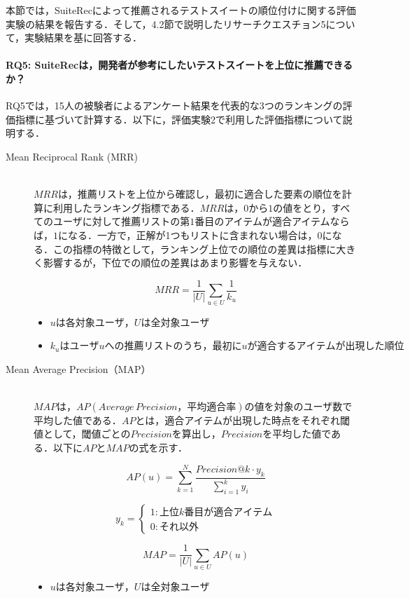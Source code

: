 \documentclass[12pt]{jarticle} %
\begin{document}
本節では，{\sf SuiteRec}によって推薦されるテストスイートの順位付けに関する評価実験の結果を報告する．そして，4.2節で説明したリサーチクエスチョン5について，実験結果を基に回答する．

\paragraph{RQ5: SuiteRecは，開発者が参考にしたいテストスイートを上位に推薦できるか？}
RQ5では，15人の被験者によるアンケート結果を代表的な3つのランキングの評価指標に基づいて計算する．以下に，評価実験2で利用した評価指標について説明する．


\begin{description}
\item[Mean Reciprocal Rank (MRR)]~\\
$MRR$は，推薦リストを上位から確認し，最初に適合した要素の順位を計算に利用したランキング指標である．$MRR$は，$0$から$1$の値をとり，すべてのユーザに対して推薦リストの第$1$番目のアイテムが適合アイテムならば，$1$になる．一方で，正解が1つもリストに含まれない場合は，$0$になる．この指標の特徴として，ランキング上位での順位の差異は指標に大きく影響するが，下位での順位の差異はあまり影響を与えない．

\[
MRR =
\frac{1}{|U|}\sum_{u\in U} \frac{1}{k_u}
\]
\begin{itemize}
\item $uは各対象ユーザ，Uは全対象ユーザ$
\item $k_uはユーザuへの推薦リストのうち，最初にuが適合するアイテムが出現した順位$
\end{itemize}


\item[Mean Average Precision（MAP）]~\\
$MAP$は，$AP(Average\, Precision，平均適合率)$の値を対象のユーザ数で平均した値である．$AP$とは，適合アイテムが出現した時点をそれぞれ閾値として，閾値ごとの$Precision$を算出し，$Precision$を平均した値である．以下に$AP$と$MAP$の式を示す．

\[
AP(u) =
\sum_{k=1}^{N} \frac{Precision@k \cdot y_k}{\sum_{i=1}^{k}y_i}
\]

\[
y_k = \begin{cases}
1 : 上位k番目が適合アイテム \\
0 : それ以外
\end{cases}
\]

\[
MAP =
\frac{1}{|U|}\sum_{u\in U} AP(u)
\]
\begin{itemize}
\item $uは各対象ユーザ，Uは全対象ユーザ$
\end{itemize}



\end{description}
\end{document}

